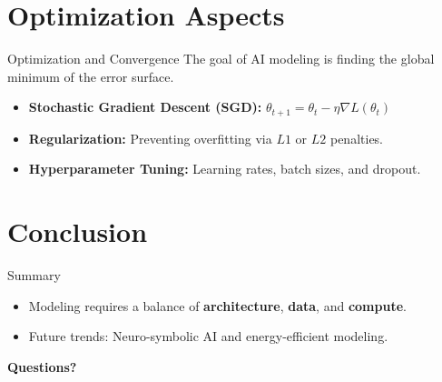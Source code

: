 \documentclass{beamer}
\begin{document}
\section{Optimization Aspects}
\begin{frame}{Optimization and Convergence}
    The goal of AI modeling is finding the global minimum of the error surface.
    \begin{itemize}
        \item \textbf{Stochastic Gradient Descent (SGD):} $ \theta_{t+1} = \theta_t - \eta \nabla L(\theta_t) $
        \item \textbf{Regularization:} Preventing overfitting via $L1$ or $L2$ penalties.
        \item \textbf{Hyperparameter Tuning:} Learning rates, batch sizes, and dropout.
    \end{itemize}
\end{frame}

\section{Conclusion}
\begin{frame}{Summary}
    \begin{itemize}
        \item Modeling requires a balance of \textbf{architecture}, \textbf{data}, and \textbf{compute}.
        \item Future trends: Neuro-symbolic AI and energy-efficient modeling.
    \end{itemize}
    \vspace{1cm}
    \centering
    \Large \textbf{Questions?}
\end{frame}
\end{document}
